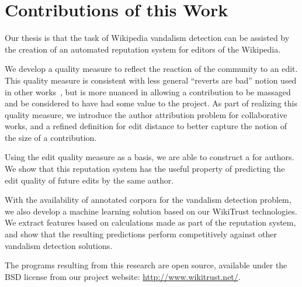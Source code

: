 \section{Contributions of this Work}

Our thesis is that the task of Wikipedia vandalism detection
can be assisted by the creation of an automated reputation system
for editors of the Wikipedia.

We develop a quality measure to reflect the reaction of
the community to an edit.
This quality measure is consistent with less general
``reverts are bad'' notion used in other
works~\cite{Smets2008,Itakura2009,Belani2010,West2010},
but is more nuanced in allowing a contribution to be massaged
and be considered to have had some value to the project.
As part of realizing this quality measure, we introduce the
author attribution problem for collaborative works,
and a refined definition for edit distance to better capture
the notion of the size of a contribution.

Using the edit quality measure as a basis, we are able
to construct a  for authors.
We show that this reputation system has the useful property
of predicting the edit quality of future edits by the same
author.

With the availability of annotated corpora for the vandalism
detection problem, we also develop a machine learning solution based on our
WikiTrust technologies.
We extract features based on calculations made as part of the
reputation system, and show that the resulting predictions perform
competitively against other vandalism detection solutions.

The programs resulting from this research are open source,
available under the BSD license from our project website:
\url{http://www.wikitrust.net/}.

